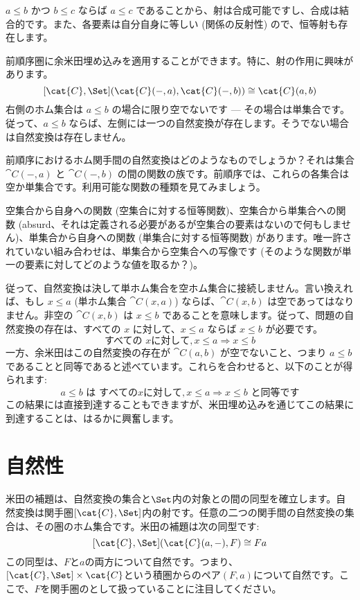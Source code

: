 $a \leqslant b$ かつ $b \leqslant c$ ならば $a \leqslant c$ であることから、射は合成可能ですし、合成は結合的です。また、各要素は自分自身に等しい (関係の反射性) ので、恒等射も存在します。

前順序圏に余米田埋め込みを適用することができます。特に、射の作用に興味があります。
\[[\cat{C}, \Set](\cat{C}(-, a), \cat{C}(-, b)) \cong \cat{C}(a, b)\]
右側のホム集合は $a \leqslant b$ の場合に限り空でないです — その場合は単集合です。従って、$a \leqslant b$ ならば、左側には一つの自然変換が存在します。そうでない場合は自然変換は存在しません。

前順序におけるホム関手間の自然変換はどのようなものでしょうか？それは集合 $\cat{C}(-, a)$ と $\cat{C}(-, b)$ の間の関数の族です。前順序では、これらの各集合は空か単集合です。利用可能な関数の種類を見てみましょう。

空集合から自身への関数 (空集合に対する恒等関数)、空集合から単集合への関数 (absurd、それは定義される必要があるが空集合の要素はないので何もしません)、単集合から自身への関数 (単集合に対する恒等関数) があります。唯一許されていない組み合わせは、単集合から空集合への写像です (そのような関数が単一の要素に対してどのような値を取るか？)。

従って、自然変換は決して単ホム集合を空ホム集合に接続しません。言い換えれば、もし $x \leqslant a$  (単ホム集合 $\cat{C}(x, a)$) ならば、$\cat{C}(x, b)$ は空であってはなりません。非空の $\cat{C}(x, b)$ は $x \leqslant b$ であることを意味します。従って、問題の自然変換の存在は、すべての $x$ に対して、$x \leqslant a$ ならば $x \leqslant b$ が必要です。
\[\text{すべての } x に対して, x \leqslant a \Rightarrow x \leqslant b\]
一方、余米田はこの自然変換の存在が $\cat{C}(a, b)$ が空でないこと、つまり $a \leqslant b$ であることと同等であると述べています。これらを合わせると、以下のことが得られます: 
\[a \leqslant b \text{ は } すべての x に対して, x \leqslant a \Rightarrow x \leqslant b \text{ と同等です}\]
この結果には直接到達することもできますが、米田埋め込みを通じてこの結果に到達することは、はるかに興奮します。

\section{自然性}

米田の補題は、自然変換の集合と$\Set$内の対象との間の同型を確立します。自然変換は関手圏$[\cat{C}, \Set]$内の射です。任意の二つの関手間の自然変換の集合は、その圏のホム集合です。米田の補題は次の同型です: 
\[[\cat{C}, \Set](\cat{C}(a, -), F) \cong F a\]
この同型は、$F$と$a$の両方について自然です。つまり、$[\cat{C}, \Set] \times \cat{C}$という積圏からのペア$(F, a)$について自然です。ここで、$F$を関手圏のとして扱っていることに注目してください。

